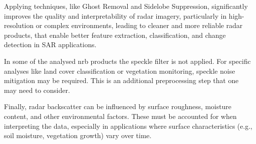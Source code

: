 Applying techniques, like Ghost Removal and Sidelobe Suppression, significantly improves the quality and interpretability of radar imagery, particularly in high-resolution or complex environments, leading to cleaner and more reliable radar products, that enable better feature extraction, classification, and change detection in SAR applications.

In some of the analysed \acs{nrb} products the speckle filter is not applied. For specific analyses like land cover classification or vegetation monitoring, speckle noise mitigation may be required. This is an additional preprocessing step that one may need to consider.

Finally, radar backscatter can be influenced by surface roughness, moisture content, and other environmental factors. These must be accounted for when interpreting the data, especially in applications where surface characteristics (e.g., soil moisture, vegetation growth) vary over time.